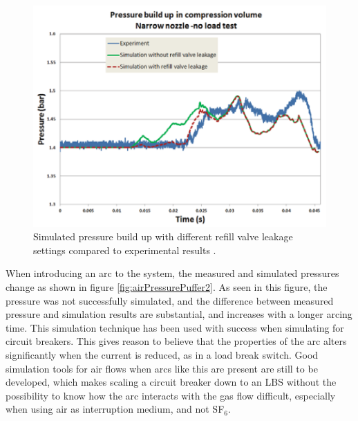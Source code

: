 \documentclass[10pt,b5paper,twoside]{article}
\begin{document}
\begin{figure} [H]
\centering
\includegraphics[scale=0.65]{Bilder/Theory/tankPressure.png}
\caption{Simulated pressure build up with different refill valve leakage settings compared to experimental results  \cite{bib:GFALEAPI}.} \label{fig:airPressurePuffer}
\end{figure}

When introducing an arc to the system, the measured and simulated pressures change as shown in figure \ref{fig:airPressurePuffer2}. As seen in this figure, the pressure was not successfully simulated, and the difference between measured pressure and simulation results are substantial, and increases with a longer arcing time. This simulation technique has been used with success when simulating for circuit breakers. This gives reason to believe that the properties of the arc alters significantly when the current is reduced, as in a load break switch. Good simulation tools for air flows when arcs like this are present are still to be developed, which makes scaling a circuit breaker down to an LBS without the possibility to know how the arc interacts with the gas flow difficult, especially when using air as interruption medium, and not SF$_6$.
\end{document}
